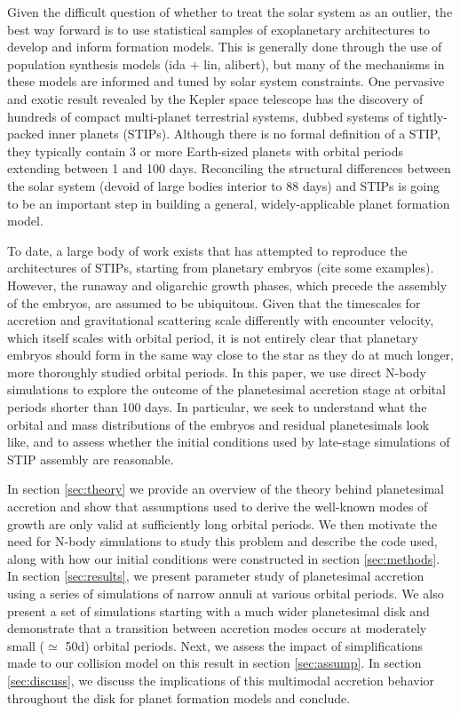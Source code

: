 \documentclass[onecolumn]{aastex63}
\begin{document}
Given the difficult question of whether to treat the solar system as an outlier, the best way forward is to use statistical samples of exoplanetary architectures to develop and inform formation models. This is generally done through the use of population synthesis models (ida + lin, alibert), but many of the mechanisms in these models are informed and tuned by solar system constraints. One pervasive and exotic result revealed by the Kepler space telescope has the discovery of hundreds of compact multi-planet terrestrial systems, dubbed systems of tightly-packed inner planets (STIPs). Although there is no formal definition of a STIP, they typically contain 3 or more Earth-sized planets with orbital periods extending between 1 and 100 days. Reconciling the structural differences between the solar system (devoid of large bodies interior to 88 days) and STIPs is going to be an important step in building a general, widely-applicable planet formation model.

To date, a large body of work exists that has attempted to reproduce the architectures of STIPs, starting from planetary embryos (cite some examples). However, the runaway and oligarchic growth phases, which precede the assembly of the embryos, are assumed to be ubiquitous. Given that the timescales for accretion and gravitational scattering scale differently with encounter velocity, which itself scales with orbital period, it is not entirely clear that planetary embryos should form in the same way close to the star as they do at much longer, more thoroughly studied orbital periods. In this paper, we use direct N-body simulations to explore the outcome of the planetesimal accretion stage at orbital periods shorter than 100 days. In particular, we seek to understand what the orbital and mass distributions of the embryos and residual planetesimals look like, and to assess whether the initial conditions used by late-stage simulations of STIP assembly are reasonable.

In section \ref{sec:theory} we provide an overview of the theory behind planetesimal accretion and show that assumptions used to derive the well-known modes of growth are only valid at sufficiently long orbital periods. We then motivate the need for N-body simulations to study this problem and describe the code used, along with how our initial conditions were constructed in section \ref{sec:methods}. In section \ref{sec:results}, we present parameter study of planetesimal accretion using a series of simulations of narrow annuli at various orbital periods. We also present a set of simulations starting with a much wider planetesimal disk and demonstrate that a transition between accretion modes occurs at moderately small ($\simeq$ 50d) orbital periods. Next, we assess the impact of simplifications made to our collision model on this result in section \ref{sec:assump}. In section \ref{sec:discuss}, we discuss the implications of this multimodal accretion behavior throughout the disk for planet formation models and conclude.
\end{document}
